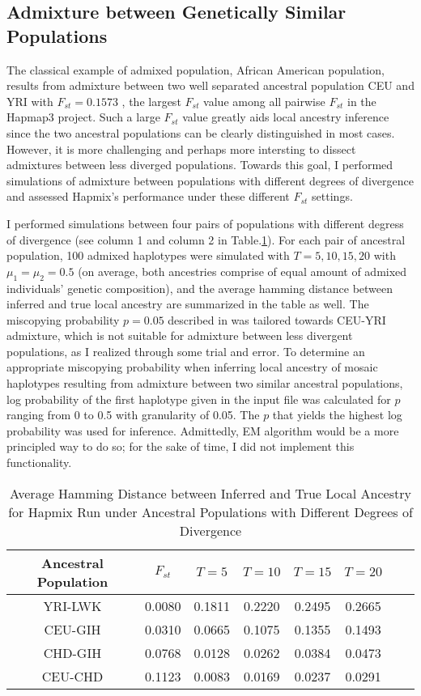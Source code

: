 \documentclass{article}
\begin{document}
\subsection{Admixture between Genetically Similar Populations}

The classical example of admixed population, African American population, results from admixture between two well separated ancestral population CEU and YRI with $F_{st}=0.1573$ \cite{hapmap3}, the largest $F_{st}$ value among all pairwise $F_{st}$ in the Hapmap3 project. Such a large $F_{st}$ value greatly aids local ancestry inference since the two ancestral populations can be clearly distinguished in most cases. However, it is more challenging and perhaps more intersting to dissect admixtures between less diverged populations. Towards this goal, I performed simulations of admixture between populations with different degrees of divergence and assessed Hapmix's performance under these different $F_{st}$ settings.

I performed simulations between four pairs of populations with different degress of divergence (see column 1 and column 2 in Table.\ref{tab:similar}). For each pair of ancestral population, 100 admixed haplotypes were simulated with $T=5,10,15,20$ with $\mu_1=\mu_2=0.5$ (on average, both ancestries comprise of equal amount of admixed individuals' genetic composition), and the average hamming distance between inferred and true local ancestry are summarized in the table as well. The miscopying probability $p=0.05$ described in \cite{hapmix} was tailored towards CEU-YRI admixture, which is not suitable for admixture between less divergent populations, as I realized through some trial and error. To determine an appropriate miscopying probability when inferring local ancestry of mosaic haplotypes resulting from admixture between two similar ancestral populations, log probability of the first haplotype given in the input file was calculated for $p$ ranging from 0 to 0.5 with granularity of 0.05. The $p$ that yields the highest log probability was used for inference. Admittedly, EM algorithm would be a more principled way to do so; for the sake of time, I did not implement this functionality.

\begin{table}[H]
\begin{center}
\begin{tabular}{  c| c | c c c c c c}
Ancestral Population & $F_{st}$ & $T=5$ & $T=10$ & $T=15$ & $T=20$ \\
\hline
YRI-LWK & 0.0080 & 0.1811 & 0.2220 & 0.2495 & 0.2665\\
CEU-GIH & 0.0310 & 0.0665 & 0.1075 & 0.1355 & 0.1493\\
CHD-GIH & 0.0768 & 0.0128 & 0.0262 & 0.0384 & 0.0473\\
CEU-CHD & 0.1123 & 0.0083 & 0.0169 & 0.0237 & 0.0291
\end{tabular}
\end{center}
\caption{Average Hamming Distance between Inferred and True Local Ancestry for Hapmix Run under Ancestral Populations with Different Degrees of Divergence}
\label{tab:similar}
\end{table}
\end{document}
